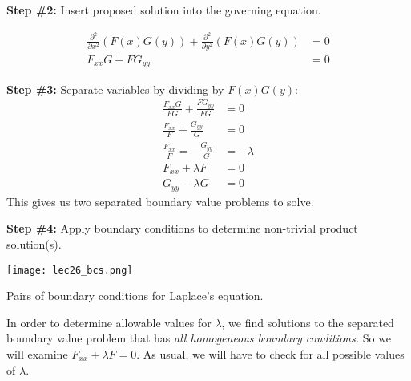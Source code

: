 \vspace{0.25cm}

\noindent\textbf{Step \#2:} Insert proposed solution into the governing equation.

\begin{align*}
\frac{\partial^2}{\partial x^2}\left(F(x)G(y)\right) + \frac{\partial^2}{\partial y^2}\left(F(x)G(y)\right) &= 0 \\
F_{xx}G + FG_{yy} &= 0
\end{align*}

\vspace{4.5cm}

\noindent\textbf{Step \#3:} Separate variables by dividing by $F(x)G(y)$:
\begin{align*}
\frac{F_{xx}G}{FG} + \frac{FG_{yy}}{FG} &= 0 \\
\frac{F_{xx}}{F} + \frac{G_{yy}}{G} &= 0 \\
\frac{F_{xx}}{F} = -\frac{G_{yy}}{G} &= -\lambda \\
F_{xx}+\lambda F &= 0 \\
G_{yy}-\lambda G &= 0
\end{align*}
This gives us two separated boundary value problems to solve.

\vspace{0.5cm}

\noindent\textbf{Step \#4:} Apply boundary conditions to determine non-trivial product solution(s).
\begin{marginfigure}
\texttt{[image: lec26\_bcs.png]}
\caption{Pairs of boundary conditions for Laplace's equation.}
\label{fig:lec26-bcs}
\end{marginfigure}

\vspace{0.1cm}

\noindent In order to determine allowable values for $\lambda$, we find solutions to the separated boundary value problem that has \emph{all homogeneous boundary conditions.}  So we will examine $F_{xx} + \lambda F = 0$.  As usual, we will have to check for all possible values of $\lambda$.

